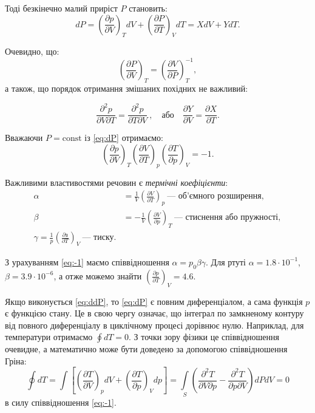 Тоді безкінечно малий приріст $P$ становить:
\begin{equation}\label{eq:dP}
    dP = \left(\frac{\partial p}{\partial V}\right)_T dV +  \left(\frac{\partial P}{\partial T}\right)_V dT = X dV + YdT.
\end{equation}

Очевидно, що:
\begin{equation*}
    \left(\frac{\partial P}{\partial V}\right)_T = \left(\frac{\partial V}{\partial P}\right)_T^{-1},
\end{equation*}
а також, що порядок отримання змішаних похідних не важливий:

\begin{equation}\label{eq:ddP}
    \frac{\partial^2 p}{\partial V \partial T} = \frac{\partial^2 p}{\partial T \partial V }\ , \quad \text{або}\quad \frac{\partial Y}{\partial V} = \frac{\partial X}{\partial T}.
\end{equation}

Вважаючи $P = \mathrm{const}$ із \eqref{eq:dP} отримаємо:
\begin{equation}\label{eq:-1}
     \left(\frac{\partial p}{\partial V}\right)_T  \left(\frac{\partial V}{\partial T}\right)_p  \left(\frac{\partial T}{\partial p}\right)_V = -1.
\end{equation}


Важливими властивостями речовин є \emph{термічні коефіцієнти}:
\begin{align*}
    \alpha &= \frac1V \left(\frac{\partial V}{\partial T} \right)_p\ \text{--- об’ємного розширення},\\
    \beta &= -\frac1V \left(\frac{\partial V}{\partial p} \right)_T\ \text{--- стиснення або пружності},\\
    \gamma = \frac1p \left(\frac{\partial з}{\partial T} \right)_V\ \text{--- тиску}.
\end{align*}

З урахуванням \eqref{eq:-1} маємо співвідношення $\alpha = p_0\beta\gamma$. Для ртуті $\alpha  = 1.8\cdot 10^{-1}$, $\beta = 3.9\cdot 10^{-6}$, а отже можемо знайти $\left(\frac{\partial p}{\partial T} \right)_V = 4.6$.

Якщо виконується \eqref{eq:ddP}, то \eqref{eq:dP} є повним диференціалом, а сама функція $p$ є функцією стану. Це в свою чергу означає, що інтеграл по замкненому контуру від повного диференціалу в циклічному процесі дорівнює нулю. Наприклад, для температури отримаємо $\oint dT = 0$. З точки зору фізики це співвідношення очевидне, а математично може бути доведено за допомогою співвідношення Гріна:
\begin{equation*}
    \oint dT = \int \left[  \left(\frac{\partial T}{\partial V}\right)_p dV +  \left(\frac{\partial T}{\partial p}\right)_V dp \right] = \int\limits_S \left(\frac{\partial^2 T}{\partial V \partial p} - \frac{\partial^2 T}{\partial p \partial V}\right) dPdV = 0
\end{equation*}
в силу співвідношення \eqref{eq:-1}.

